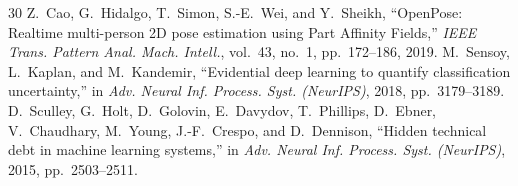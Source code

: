 \documentclass[10pt,journal,compsoc]{IEEEtran}
\begin{document}
\begin{thebibliography}{30}
 Z.~Cao, G.~Hidalgo, T.~Simon, S.-E.~Wei, and Y.~Sheikh, ``OpenPose: Realtime multi-person 2D pose estimation using Part Affinity Fields,'' \emph{IEEE Trans. Pattern Anal. Mach. Intell.}, vol.~43, no.~1, pp.~172--186, 2019.
 M.~Sensoy, L.~Kaplan, and M.~Kandemir, ``Evidential deep learning to quantify classification uncertainty,'' in \emph{Adv. Neural Inf. Process. Syst. (NeurIPS)}, 2018, pp.~3179--3189.
 D.~Sculley, G.~Holt, D.~Golovin, E.~Davydov, T.~Phillips, D.~Ebner, V.~Chaudhary, M.~Young, J.-F.~Crespo, and D.~Dennison, ``Hidden technical debt in machine learning systems,'' in \emph{Adv. Neural Inf. Process. Syst. (NeurIPS)}, 2015, pp.~2503--2511.
\end{thebibliography}
\end{document}
